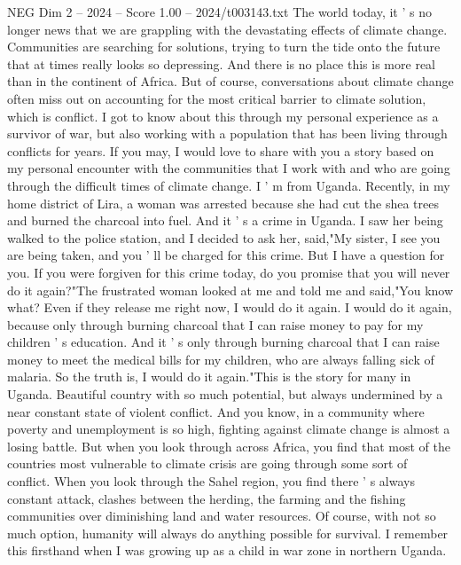 \begin{textsample}{NEG Dim 2 – 2024 – Score 1.00 – 2024/t003143.txt}  \label{ex:f2_neg_063}
The world today, it ' s no longer news that we are grappling with the devastating effects of climate change.
Communities are searching for solutions, trying to turn the tide onto the future that at times really looks so depressing.
And there is no place this is more real than in the continent of Africa.
But of course, conversations about climate change often miss out on accounting for the most critical barrier to climate solution, which is conflict.
I got to know about this through my personal experience as a survivor of war, but also working with a population that has been living through conflicts for years.
If you may, I would love to share with you a story based on my personal encounter with the communities that I work with and who are going through the difficult times of climate change.
I ' m from Uganda.
Recently, in my home district of Lira, a woman was arrested because she had cut the shea trees and burned the charcoal into fuel.
And it ' s a crime in Uganda.
I saw her being walked to the police station, and I decided to ask her, said,"My sister, I see you are being taken, and you ' ll be charged for this crime.
But I have a question for you.
If you were forgiven for this crime today, do you promise that you will never do it again?"The frustrated woman looked at me and told me and said,"You know what?
Even if they release me right now, I would do it again.
I would do it again, because only through burning charcoal that I can raise money to pay for my children ' s education.
And it ' s only through burning charcoal that I can raise money to meet the medical bills for my children, who are always falling sick of malaria.
So the truth is, I would do it again."This is the story for many in Uganda.
Beautiful country with so much potential, but always undermined by a near constant state of violent conflict.
And you know, in a community where poverty and unemployment is so high, fighting against climate change is almost a losing battle.
But when you look through across Africa, you find that most of the countries most vulnerable to climate crisis are going through some sort of conflict.
When you look through the Sahel region, you find there ' s always constant attack, clashes between the herding, the farming and the fishing communities over diminishing land and water resources.
Of course, with not so much option, humanity will always do anything possible for survival.
I remember this firsthand when I was growing up as a child in war zone in northern Uganda.

\end{textsample}
